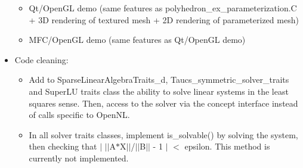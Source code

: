 \begin{itemize}
\begin{itemize}
        \item Qt/OpenGL demo (same features as polyhedron\_ex\_parameterization.C
        + 3D rendering of textured mesh + 2D rendering of parameterized mesh)

        \item MFC/OpenGL demo (same features as Qt/OpenGL demo)

    \end{itemize}

\item Code cleaning:

    \begin{itemize}

    \item Add to SparseLinearAlgebraTraits\_d, Taucs\_symmetric\_solver\_traits
    and SuperLU traits class
    the ability to solve linear systems in the least squares sense. Then, access to
    the solver via the concept interface instead of calls specific to OpenNL.

    \item In all solver traits classes,
    implement is\_solvable() by solving the system, then checking that $|$ $|$$|$A$\ast$X$|$$|$/$|$$|$B$|$$|$ - 1 $|$ $<$ epsilon. This method is
    currently not implemented.

    \end{itemize}

\end{itemize}
